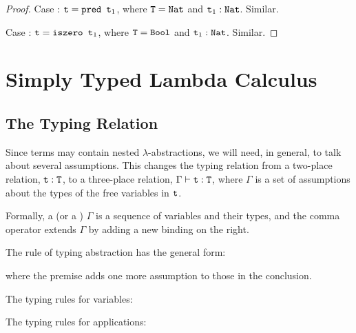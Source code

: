 \documentclass[11pt,twoside=off,numbers=noenddot]{scrbook}
\begin{document}
\begin{proof}
  Case : $\ttt{t} = \ttt{pred $\ttt{t}_1$}$, where
  $\ttt{T} = \ttt{Nat}$ and $\ttt{t}_1 : \ttt{Nat}$. Similar.

  Case : $\ttt{t} = \ttt{iszero $\ttt{t}_1$}$, where
  $\ttt{T} = \ttt{Bool}$ and $\ttt{t}_1 : \ttt{Nat}$. Similar.
\end{proof}

\chapter{Simply Typed Lambda Calculus}

\section{The Typing Relation}
Since terms may contain nested $\lambda$-abstractions, we will need,
in general, to talk about several assumptions. This changes the
typing relation from a two-place relation, $\ttt{t} : \ttt{T}$, to a
three-place relation, $\Gamma \vdash \ttt{t} : \ttt{T}$, where
$\Gamma$ is a set of assumptions about the types of the free
variables in $\ttt{t}$.

\begin{definition}
  Formally, a  (or a )
  $\Gamma$ is a sequence of variables and their types, and the comma
  operator extends $\Gamma$ by adding a new binding on the right.
\end{definition}

The rule of typing abstraction has the general form:
\begin{prooftree}
   
\end{prooftree}
where the premise adds one more assumption to those in the conclusion.

The typing rules for variables:
\begin{prooftree}
\end{prooftree}

The typing rules for applications:
\begin{prooftree}
\end{prooftree}
\end{document}
